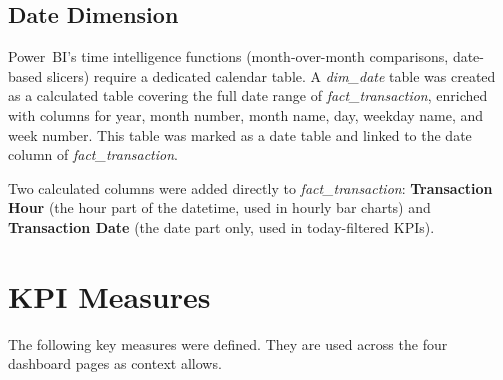 \subsection{Date Dimension}

Power~BI's time intelligence functions (month-over-month comparisons, date-based
slicers) require a dedicated calendar table. A \textit{dim\_date} table was created
as a calculated table covering the full date range of \textit{fact\_transaction},
enriched with columns for year, month number, month name, day, weekday name, and
week number. This table was marked as a date table and linked to the date column of
\textit{fact\_transaction}.

Two calculated columns were added directly to \textit{fact\_transaction}:
\textbf{Transaction Hour} (the hour part of the datetime, used in hourly bar charts)
and \textbf{Transaction Date} (the date part only, used in today-filtered KPIs).

\section{KPI Measures}

The following key measures were defined. They are used across the four dashboard
pages as context allows.

